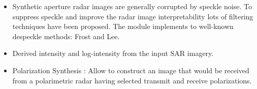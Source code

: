 \begin{itemize}
\item Synthetic aperture radar images are generally corrupted by
  speckle noise.  To suppress speckle and improve the radar image
  interpretability lots of filtering techniques have been proposed.
  The module implements to well-known despeckle methods: Frost and
  Lee.
\item Derived intensity and log-intensity from the input SAR imagery.
\item Polarization Synthesis : Allow to construct an image that would
  be received from a polarimetric radar having selected transmit and
  receive polarizations.
\end{itemize}
